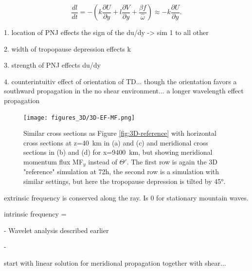 \begin{equation}
    \frac{dl}{dt} = -(k \frac{\partial U}{\partial y} + l \frac{\partial V}{\partial y} + \frac{\beta f}{\hat{\omega}})
    \approx -k \frac{\partial U}{\partial y}.
    \label{equ:meridionalRefraction2}
\end{equation}

1. location of PNJ effects the sign of the du/dy -> sim 1 to all other

2. width of tropopause depression effects k

3. strength of PNJ effects du/dy

4. counterintuitiv effect of orientation of TD... though the orientation favors a southward propagation in the no shear environment... a longer wavelength    effect propagation

\begin{figure}[tbp]
    \centering
    \texttt{[image: figures\_3D/3D-EF-MF.png]}
    \caption{Similar cross sections as Figure \ref{fig:3D-reference} with horizontal cross sections at z=\SI{40}{\kilo\meter} in (a) and (c) and meridional cross sections in (b) and (d) for x=\SI{9400}{\kilo\meter}, but showing meridional momentum flux MF$_y$ instead of $\Theta'$. The first row is again the 3D "reference" simulation at 72h, the second row is a simulation with similar settings, but here the tropopause depression is tilted by 45°.}
    \label{fig:3D-MFy}
\end{figure}




extrinsic frequency is conserved along the ray. Is 0 for stationary mountain waves.

intrinsic frequency = 

- Wavelet analysis described earlier

- \cite[]{}




start with linear solution for meridional propagation together with shear...




